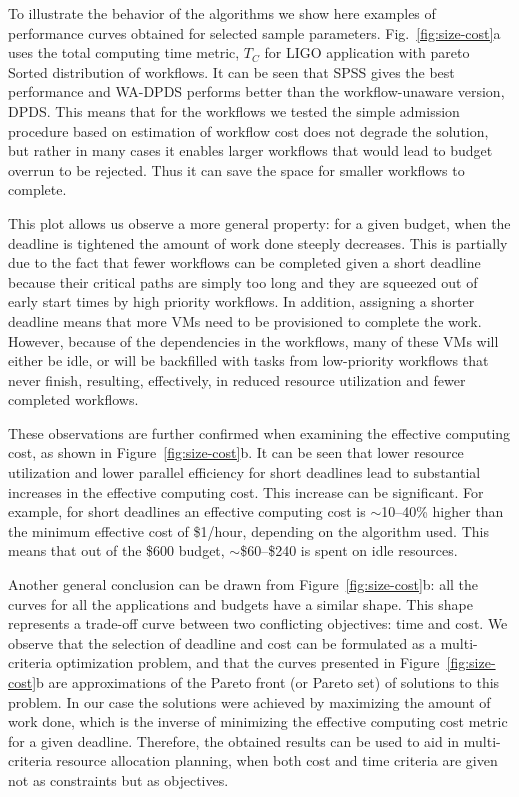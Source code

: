 \documentclass[conference]{IEEEtran}
\begin{document}
To illustrate the behavior of the algorithms we show here examples of
performance curves obtained for selected sample parameters.
Fig.~\ref{fig:size-cost}a uses the total computing time metric, $T_C$ for LIGO
application with pareto Sorted distribution of workflows. It can be seen that
SPSS gives the best performance and WA-DPDS performs better than the
workflow-unaware version, DPDS. This means that for the workflows we tested the
simple admission procedure based on estimation of workflow cost does not degrade
the solution, but rather in many cases it enables larger workflows that would
lead to budget overrun to be rejected. Thus it can save the space for smaller
workflows to complete.

This plot allows us observe a more general property: for a given budget,
when the deadline is tightened the amount of work done steeply decreases.
This is partially due to the fact that fewer workflows can be
completed given a short deadline because their critical paths are simply too long
and they are squeezed out of early start times by high priority workflows.
In addition, assigning a shorter deadline means that more VMs need to be
provisioned to complete the work. However, because of the dependencies in the
workflows, many of these VMs will either be idle, or will be backfilled with
tasks from low-priority workflows that never finish, resulting, effectively,
in reduced resource utilization and fewer completed workflows.

These observations are further confirmed when examining the effective computing
cost, as shown in Figure~\ref{fig:size-cost}b. It can be seen that lower
resource utilization and lower parallel efficiency for short deadlines lead to
substantial increases in the effective computing cost. This increase can be
significant. For example, for short deadlines an effective computing cost
is $\sim$10--40\% higher than the minimum effective cost of \$1/hour, depending
on the algorithm used. This means that out of the \$600 budget,
$\sim$\$60--\$240 is spent on idle resources.

Another general conclusion can be drawn from Figure~\ref{fig:size-cost}b:
all the curves for all the applications and budgets have a similar shape. This
shape represents a trade-off curve between two conflicting objectives: time and cost.
We observe that the selection of deadline and cost can be formulated as a
multi-criteria optimization problem, and that the curves presented in
Figure~\ref{fig:size-cost}b are approximations of the Pareto front (or Pareto
set) of solutions to this problem. In our case the solutions were achieved by maximizing
the amount of work done, which is the inverse of minimizing the effective
computing cost metric for a given deadline. Therefore, the obtained results
can be used to aid in multi-criteria resource allocation planning, when both
cost and time criteria are given not as constraints but as objectives.
\end{document}
